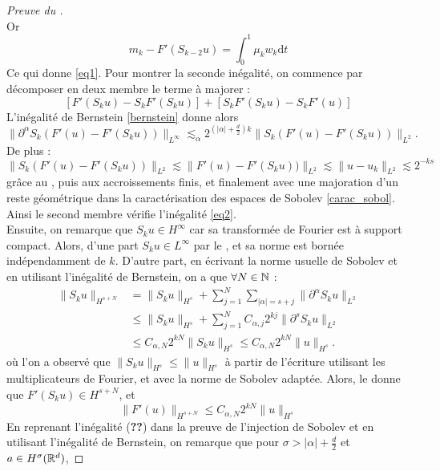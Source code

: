 \documentclass[11pt,a4paper]{article}
\begin{document}
\begin{proof}[Preuve du ]
\begin{equation*}
\end{equation*}
Or 
\begin{equation*}
m_k - F'(S_{k-2}u) = \int_0^1 \mu_k w_k\mathrm{d}t
\end{equation*}
Ce qui donne \eqref{eq1}.
Pour montrer la seconde inégalité, on commence par décomposer en deux membre le terme à majorer :
\begin{equation*}
\left[ F'(S_{k}u) - S_k F'(S_{k}u) \right] + \left[ S_k F'(S_{k}u) - S_kF'(u) \right]
\end{equation*}
L'inégalité de Bernstein \eqref{bernstein} donne alors 
\begin{equation*}
\|\partial^\alpha S_k (F'(u) - F'(S_ku) )\|_{L^\infty} \lesssim_\alpha 2^{(|\alpha| + \frac{d}{2})k } \|S_k (F'(u) - F'(S_ku) )\|_{L^2}.
\end{equation*}
De plus :
\begin{equation*}
\|S_k (F'(u) - F'(S_ku) )\|_{L^2} \lesssim \|F'(u) - F'(S_ku) )\|_{L^2} \lesssim \|u-u_k\|_{L^2} \lesssim 2^{-ks}
\end{equation*}
grâce au , puis aux accroissements finis, et finalement avec une majoration d'un reste géométrique dans la caractérisation des espaces de Sobolev \eqref{carac_sobol}. Ainsi le second membre vérifie l'inégalité \eqref{eq2}. \\
Ensuite, on remarque que $S_ku \in H^\infty$ car sa transformée de Fourier est à support compact. Alors, d'une part $S_ku \in L^\infty	$ par le , et sa norme est bornée indépendamment de $k$. D'autre part, en écrivant la norme usuelle de Sobolev et en utilisant l'inégalité de Bernstein, on a que $\forall N \in \mathbb N$ :
\begin{align*}
 \|S_ku\|_{H^{s+N}} &= \|S_ku\|_{H^s} + \sum_{j=1}^N\sum_{|\alpha|=s+j} \|\partial^\alpha S_k u \|_{L^2} \\
& \leq \|S_ku\|_{H^s} + \sum_{j=1}^N C_{\alpha,j} 2^{kj} \|\partial^s S_ku\|_{L^2} \\
& \leq C_{\alpha,N} 2^{kN}\|S_ku\|_{H^s} \leq C_{\alpha,N} 2^{kN}\|u\|_{H^s} .
\end{align*}
où l'on a observé que $\|S_ku\|_{H^s} \leq \|u\|_{H^s}$ à partir de l'écriture utilisant les multiplicateurs de Fourier, et avec la norme de Sobolev adaptée. Alors, le  donne que $F'(S_ku)\in H^{s+N}$, et 
\begin{equation}\label{utillem}
\|F'(u)\|_{H^{s+N}} \leq C_{\alpha,N}2^{kN}\|u\|_{H^s}
\end{equation}
En reprenant l'inégalité (\textbf{??}) dans la preuve de l'injection de Sobolev et en utilisant l'inégalité de Bernstein, on remarque que pour $\sigma > |\alpha| + \frac{d}{2}$ et $a\in H^\sigma(\mathbb R^d)$,

\end{proof}
\end{document}
